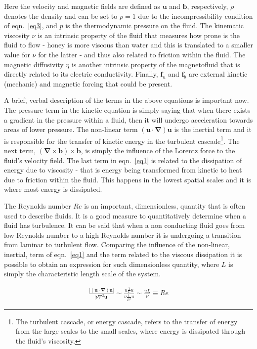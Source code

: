 \documentclass[a4paper,12pt]{article}
\begin{document}
Here the velocity and magnetic fields are defined as $\bm u$ and $\bm b$, respectively, $\rho$ denotes the density and can be set to $\rho = 1$ due to the incompressibility condition of eqn.~\ref{eq3}, and $p$ is the thermodynamic pressure on the fluid. The kinematic viscosity $\nu$ is an intrinsic property of the fluid that measures how prone is the fluid to flow - honey is more viscous than water and this is translated to a smaller value for $\nu$ for the latter - and thus also related to friction within the fluid. The magnetic diffusivity $\eta$ is another intrinsic property of the magnetofluid that is directly related to its electric conductivity. Finally, $\bm f_u$ and $\bm f_b$ are external kinetic (mechanic) and magnetic forcing that could be present. 

A brief, verbal description of the terms in the above equations is important now. The pressure term in the kinetic equation is simply saying that when there exists a gradient in the pressure within a fluid, then it will undergo acceleration towards areas of lower pressure. The non-linear term $(\bm u \cdot \bm \nabla)\bm u$ is the inertial term and it is responsible for the transfer of kinetic energy in the turbulent cascade\footnote{The turbulent cascade, or energy cascade, refers to the transfer of energy from the large scales to the small scales, where energy is dissipated through the fluid's viscosity.}. The next term, $(\bm \nabla \times \bm b) \times \bm b$, is simply the influence of the Lorentz force to the fluid's velocity field. The last term in eqn.~\ref{eq1} is related to the dissipation of energy due to viscosity - that is energy being transformed from kinetic to heat due to friction within the fluid. This happens in the lowest spatial scales and it is where most energy is dissipated. 

The Reynolds number $Re$ is an important, dimensionless, quantity that is often used to describe fluids. It is a good measure to quantitatively determine when a fluid has turbulence. It can be said that when a non conducting fluid goes from low Reynolds number to a high Reynolds number it is undergoing a transition from laminar to turbulent flow. Comparing the influence of the non-linear, inertial, term of eqn.~\ref{eq1} and the term related to the viscous dissipation it is possible to obtain an expression for such dimensionless quantity, where $L$ is simply the characteristic length scale of the system.

\begin{align}
 \frac{\vert (\bm u \cdot \bm \nabla) \bm u \vert}{\vert \nu \nabla^2 \bm u \vert} \sim \frac{u \frac{1}{L} u}{\nu \frac{1}{L^2} u} \sim \frac{u L}{\nu} \equiv Re \nonumber
\end{align}
\end{document}
